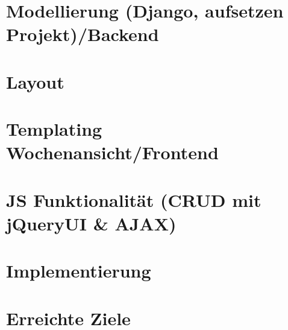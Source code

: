 
\section{Modellierung (Django, aufsetzen Projekt)/Backend }
\section{Layout}
\section{Templating Wochenansicht/Frontend}
\section{JS Funktionalität (CRUD mit jQueryUI \& AJAX) }
\section{Implementierung}
\section{Erreichte Ziele}
